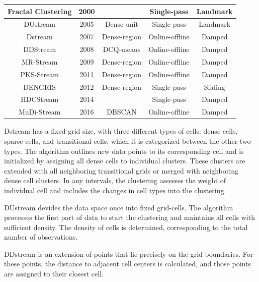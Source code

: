 \documentclass[../UNBThesis2.tex]{subfiles}
\begin{document}
\begin{itemize}
\begin{table}[h]
\begin{tabular}{c c c c c}
      Fractal Clustering &    2000        &           &  Single-pass        & Landmark\\
          \hline 
     DUstream            &    2005        &      Dense-unit       &     Single-pass     &  Landmark\\
      \hline
      Dstream            &     2007       &    Dense-region       &  Online-offline     &   Damped\\
    \hline 
      DDStream           &    2008        &    DCQ-means          &     Online-offline  & Damped \\
    \hline 
      MR-Stream          &    2009        &     Dense-region      &  Online-offline     & Damped\\
    \hline 
      PKS-Stream         &    2011        &    Dense-region       &  Online-offline     & Damped\\
          \hline 
      DENGRIS            &    2012        &   Dense-region        &  Single-pass        & Sliding\\
          \hline 
      HDCStream            &    2014        &           &    Single-pass      & Damped\\
          \hline 
      MuDi-Stream        &    2016        &       DBSCAN          & Online-offline      & Damped\\
\bottomrule
    \end{tabular}
\end{table}

Dstream has a fixed grid size, with three different types of cells: dense cells, sparse cells, and transitional cells, which it is categorized between the other two types. The algorithm outlines new data points to its corresponding cell and is initialized by assigning all dense cells to individual clusters. These clusters are extended with all neighboring transitional grids or merged with neighboring dense cell clusters. In any intervals, the clustering assesses the weight of individual cell and includes the
changes in cell types into the clustering.


DUstream \cite{gao2005incremental} devides the data space once into fixed grid-cells.
The algorithm processes the first part of data to start the clustering and maintains all cells with sufficient density. The density of cells is determined, corresponding to the total number of observations. 

DDstream \cite{jia2008grid} is an extension of points that lie precisely on the grid boundaries. For these points, the distance to adjacent cell centers is calculated, and those points are assigned to their closest cell. 






\end{itemize}
\end{document}
